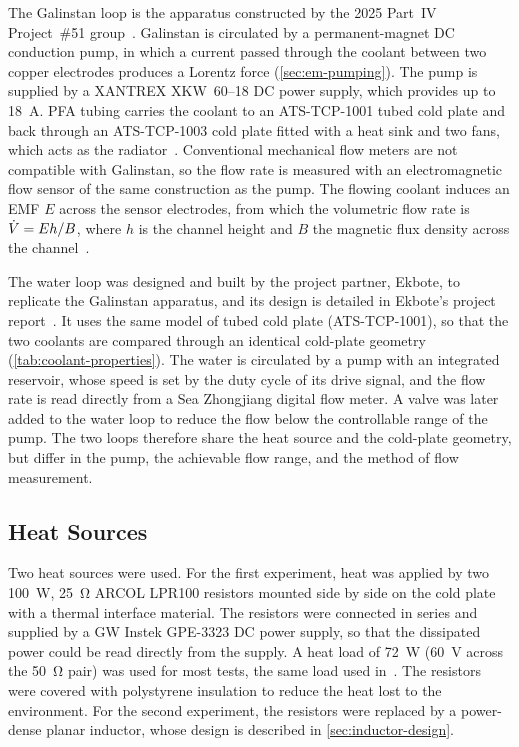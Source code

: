 The Galinstan loop is the apparatus constructed by the 2025 Part~IV Project~\#51
group~\cite{kwon_project_2025,loh_project_2025}. Galinstan is circulated by a
permanent-magnet DC conduction pump, in which a current passed through the
coolant between two copper electrodes produces a Lorentz force
(\cref{sec:em-pumping}). The pump is supplied by a XANTREX XKW~60--18 DC power
supply, which provides up to \SI{18}{\ampere}. PFA tubing carries the coolant
to an ATS-TCP-1001 tubed cold plate and back through an ATS-TCP-1003 cold plate
fitted with a heat sink and two fans, which acts as the
radiator~\cite{kwon_project_2025,advanced_thermal_solutions_inc_tubed_2021}.
Conventional mechanical flow meters are not compatible with Galinstan, so the
flow rate is measured with an electromagnetic flow sensor of the same
construction as the pump. The flowing coolant induces an EMF $E$ across the
sensor electrodes, from which the volumetric flow rate is $\dot{V} = Eh/B$, where
$h$ is the channel height and $B$ the magnetic flux density across the
channel~\cite{kwon_project_2025}.

The water loop was designed and built by the project partner, Ekbote, to
replicate the Galinstan apparatus, and its design is detailed in Ekbote's
project report~\cite{ekbote_project_2026}. It uses the same model of tubed cold
plate (ATS-TCP-1001), so that the two
coolants are compared through an identical cold-plate geometry
(\cref{tab:coolant-properties}). The water is circulated by a pump with an
integrated reservoir, whose speed is set by the duty cycle of its drive signal,
and the flow rate is read directly from a Sea Zhongjiang digital flow meter. A
valve was later added to the water loop to reduce the flow below the
controllable range of the pump. The two loops therefore share the heat source
and the cold-plate geometry, but differ in the pump, the achievable flow range,
and the method of flow measurement.

\subsection{Heat Sources}
\label{sec:heat-sources}

Two heat sources were used. For the first experiment, heat was applied by two
\SI{100}{\watt}, \SI{25}{\ohm} ARCOL LPR100 resistors mounted side by side on the
cold plate with a thermal interface material. The resistors were connected in
series and supplied by a GW Instek GPE-3323 DC power supply, so that the
dissipated power could be read directly from the supply. A heat load of
\SI{72}{\watt} (\SI{60}{\volt} across the \SI{50}{\ohm} pair) was used for most
tests, the same load used in~\cite{kwon_project_2025,loh_project_2025}. The
resistors were covered with polystyrene insulation to reduce the heat lost to
the environment. For the second experiment, the resistors were replaced by a
power-dense planar inductor, whose design is described in
\cref{sec:inductor-design}.

